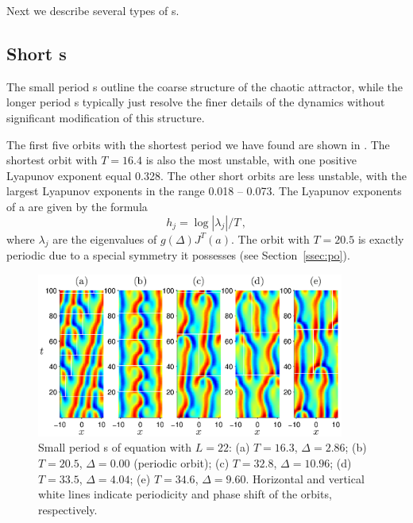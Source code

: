 Next we describe several types of \rpo s.

\subsection{Short \rpo s}  The small period \rpo s outline the
coarse structure of the chaotic attractor, while the longer period
\rpo s typically just resolve the finer details of the dynamics
without significant modification of this structure.

The first five orbits with the shortest period we have found are
shown in .  The shortest orbit with $T =
16.4$ is also the most unstable, with one positive Lyapunov exponent
equal 0.328.  The other short orbits are less unstable, with the
largest Lyapunov exponents in the range 0.018 -- 0.073.  The
Lyapunov exponents of a \rpo are given by the formula
\[h_j = \log |\lambda_j|/T\,,\]
where $\lambda_j$ are the eigenvalues of $g(\Delta)J^T(a)$.  The
orbit with $T = 20.5$ is exactly periodic due to a special symmetry
it possesses (see Section~\ref{ssec:po}).

\begin{figure}[t]
\begin{center}
\includegraphics[width=0.9\textwidth]{figs/ks22rposShort.eps}
\end{center}
\caption{Small period \rpo s of \KS equation with $L = 22$: (a) $T =
16.3$, $\Delta = 2.86$; (b) $T = 20.5$, $\Delta = 0.00$ (periodic
orbit); (c) $T = 32.8$, $\Delta = 10.96$; (d) $T = 33.5$, $\Delta =
4.04$; (e) $T = 34.6$, $\Delta = 9.60$.  Horizontal and vertical
white lines indicate periodicity and phase shift of the orbits,
respectively. }\label{f:ks22rposShort}
\end{figure}


